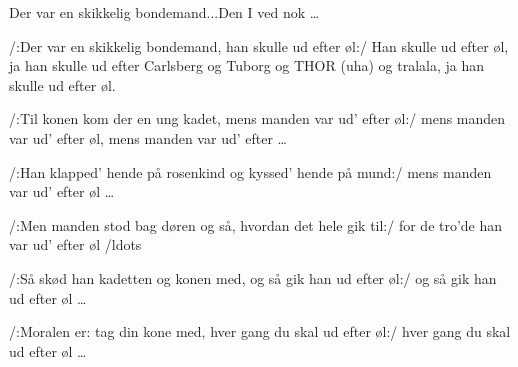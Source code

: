 \begin{sang}{Der var en skikkelig bondemand...}{Den I ved nok \ldots}
\begin{vers}
/:Der var en skikkelig bondemand,
han skulle ud efter øl:/
Han skulle ud efter øl,
ja han skulle ud efter Carlsberg og
Tuborg og THOR (uha) og tralala, 
ja han skulle ud efter øl.
\end{vers} 
\begin{vers}
/:Til konen kom der en ung kadet,
mens manden var ud' efter øl:/
mens manden var ud' efter øl, 
mens manden var ud' efter \ldots 
\end{vers} 
\begin{vers}
/:Han klapped' hende på rosenkind
og kyssed' hende på mund:/ 
mens manden var ud' efter øl \ldots 
\end{vers}
\begin{vers}
/:Men manden stod bag døren og så,
hvordan det hele gik til:/ 
for de tro'de han var ud' efter øl /ldots 
\end{vers} 
\begin{vers}
/:Så skød han kadetten og konen med,
og så gik han ud efter øl:/ 
og så gik han ud efter øl \ldots
\end{vers} 
\begin{vers}
/:Moralen er: tag din kone med,
hver gang du skal ud efter øl:/  
hver gang du skal ud efter øl \ldots  
\end{vers}
\vbox{}\vfill
\laps
\end{sang}
